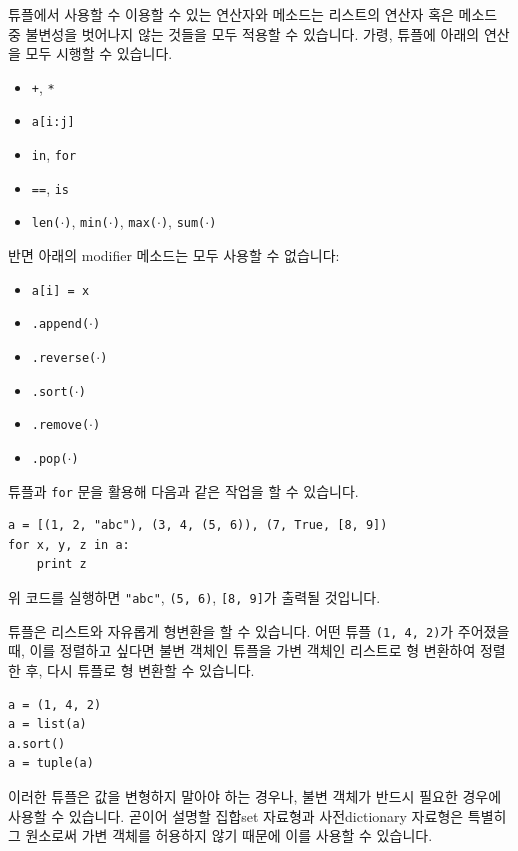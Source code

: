 \documentclass[../main.tex]{subfiles}
\begin{document}
튜플에서 사용할 수 이용할 수 있는 연산자와 메소드는 리스트의 연산자 혹은 메소드 중 불변성을 벗어나지 않는 것들을 모두 적용할 수 있습니다.
가령, 튜플에 아래의 연산을 모두 시행할 수 있습니다.
\begin{itemize}
    \item \texttt{+}, \texttt{*}
    \item \texttt{a[i:j]}
    \item \texttt{in}, \texttt{for}
    \item \texttt{==}, \texttt{is}
    \item \texttt{len($\cdot$)}, \texttt{min($\cdot$)}, \texttt{max($\cdot$)}, \texttt{sum($\cdot$)}
\end{itemize}
반면 아래의 modifier 메소드는 모두 사용할 수 없습니다:
\begin{itemize}
    \item \texttt{a[i] = x}
    \item \texttt{.append($\cdot$)}
    \item \texttt{.reverse($\cdot$)}
    \item \texttt{.sort($\cdot$)}
    \item \texttt{.remove($\cdot$)}
    \item \texttt{.pop($\cdot$)}
\end{itemize}

튜플과 \texttt{for} 문을 활용해 다음과 같은 작업을 할 수 있습니다.
\begin{verbatim}
a = [(1, 2, "abc"), (3, 4, (5, 6)), (7, True, [8, 9])
for x, y, z in a:
    print z
\end{verbatim}
위 코드를 실행하면 \texttt{"abc"}, \texttt{(5, 6)}, \texttt{[8, 9]}가 출력될 것입니다.

튜플은 리스트와 자유롭게 형변환을 할 수 있습니다.
어떤 튜플 \texttt{(1, 4, 2)}가 주어졌을 때, 이를 정렬하고 싶다면 불변 객체인 튜플을 가변 객체인 리스트로 형 변환하여 정렬한 후, 다시 튜플로 형 변환할 수 있습니다.
\begin{verbatim}
a = (1, 4, 2)
a = list(a)
a.sort()
a = tuple(a)
\end{verbatim}

이러한 튜플은 값을 변형하지 말아야 하는 경우나, 불변 객체가 반드시 필요한 경우에 사용할 수 있습니다.
곧이어 설명할 집합set 자료형과 사전dictionary 자료형은 특별히 그 원소로써 가변 객체를 허용하지 않기 때문에 이를 사용할 수 있습니다.
\end{document}
